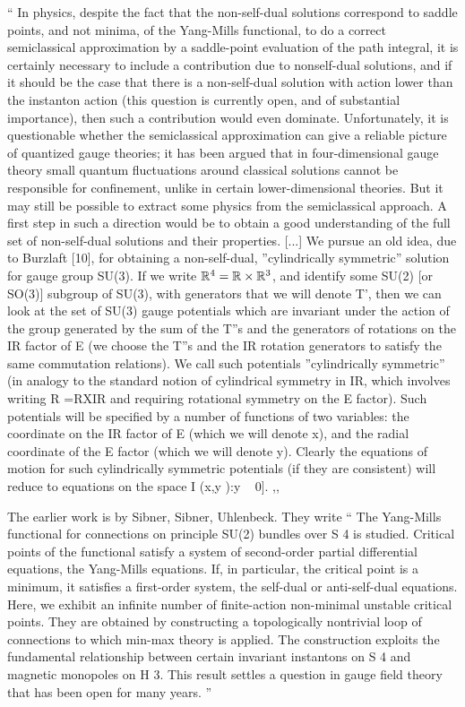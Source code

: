 \begin{description}
``
In physics, despite the fact that the non-self-dual solutions correspond
to saddle points, and not minima, of the Yang-Mills functional, to do a
correct semiclassical approximation by a saddle-point evaluation of the
path integral, it is certainly necessary to include a contribution due to
nonself-dual solutions, and if it should be the case that there is a
non-self-dual solution with action lower than the instanton action (this
question is currently open, and of substantial importance), then such a
contribution would even dominate. Unfortunately, it is questionable
whether the semiclassical approximation can give a reliable picture of
quantized gauge theories; it has been argued that in four-dimensional
gauge theory small quantum fluctuations
around classical solutions cannot be responsible for
confinement, unlike in certain lower-dimensional
theories. But it may still be possible to extract some
physics from the semiclassical approach. A first step in
such a direction would be to obtain a good understanding
of the full set of non-self-dual solutions and their properties.
[...] We pursue an old idea, due to Burzlaft
[10], for obtaining a non-self-dual, ''cylindrically symmetric''
solution for gauge group SU(3). If we write
$\mathbb{R}^4 = \mathbb{R} \times \mathbb{R}^3$, and identify some SU(2) [or SO(3)] subgroup
of SU(3), with generators that we will denote T', then we
can look at the set of SU(3) gauge potentials which are invariant
under the action of the group generated by the
sum of the T''s and the generators of rotations on the IR
factor of E (we choose the T''s and the IR rotation generators
to satisfy the same commutation relations). We
call such potentials ''cylindrically symmetric'' (in analogy
to the standard notion of cylindrical symmetry in IR,
which involves writing R =RXIR and requiring rotational
symmetry on the E factor). Such potentials will
be specified by a number of functions of two variables:
the coordinate on the IR factor of E (which we will
denote x), and the radial coordinate of the E factor
(which we will denote y). Clearly the equations of motion
for such cylindrically symmetric potentials (if they are
consistent) will reduce to equations on the space
I (x,y ):y ~ 0].
,,

The earlier work is by Sibner, Sibner, Uhlenbeck. They
write ``
The Yang-Mills functional for connections on principle SU(2) bundles over
S 4 is studied. Critical points of the functional satisfy a system of
second-order partial differential equations, the Yang-Mills equations. If,
in particular, the critical point is a minimum, it satisfies a
first-order system, the self-dual or anti-self-dual equations. Here, we
exhibit an infinite number of finite-action non-minimal unstable critical
points. They are obtained by constructing a topologically nontrivial loop
of connections to which min-max theory is applied. The construction
exploits the fundamental relationship between certain invariant
instantons on S 4 and magnetic monopoles on H 3. This result settles a
question in gauge field theory that has been open for many years.
''


\end{description}
